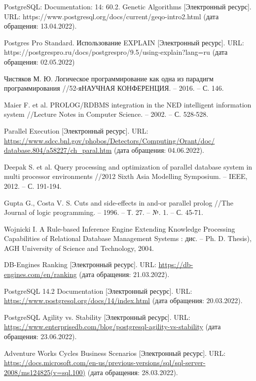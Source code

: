 \begin{thebibliography}{3}
	PostgreSQL: Documentation: 14: 60.2. Genetic Algorithms [Электронный ресурс]. URL: https://www.postgresql.org/docs/current/geqo-intro2.html (дата обращения: 13.04.2022).
	
	Postgres Pro Standard. Использование EXPLAIN [Электронный ресурс]. URL:
	https://postgrespro.ru/docs/postgrespro/9.5/using-explain?lang=ru (дата обращения: 02.05.2022)
	
	Чистяков М. Ю. Логическое программирование как одна из парадигм программирования //52-яНАУЧНАЯ КОНФЕРЕНЦИЯ. – 2016. – С. 146.
	
	Maier F. et al. PROLOG/RDBMS integration in the NED intelligent information system //Lecture Notes in Computer Science. – 2002. – С. 528-528.
	
	Parallel Execution [Электронный ресурс]. URL:  \url{https://www.sdcc.bnl.gov/phobos/Detectors/Computing/Orant/doc/ 
	database.804/a58227/ch\_paral.htm} (дата обращения: 04.06.2022).
	
	Deepak S. et al. Query processing and optimization of parallel database system in multi processor environments //2012 Sixth Asia Modelling Symposium. – IEEE, 2012. – С. 191-194.
	
	Gupta G., Costa V. S. Cuts and side-effects in and-or parallel prolog //The Journal of logic programming. – 1996. – Т. 27. – №. 1. – С. 45-71.
	
	Wojnicki I. A Rule-based Inference Engine Extending Knowledge Processing Capabilities of Relational Database Management Systems : дис. – Ph. D. Thesis), AGH University of Science and Technology, 2004.
	
	DB-Engines Ranking [Электронный ресурс]. URL: \url{https://db-engines.com/en/ranking}
	(дата обращения: 21.03.2022).
	
	PostgreSQL 14.2 Documentation [Электронный ресурс]. URL: \url{https://www.postgresql.org/docs/14/index.html} (дата обращения: 20.03.2022).
	
	PostgreSQL Agility vs. Stability [Электронный ресурс]. URL: \url{https://www.enterprisedb.com/blog/postgresql-agility-vs-stability} (дата обращения: 23.06.2022).
	
	Adventure Works Cycles Business Scenarios [Электронный ресурс]. URL: \url{https://docs.microsoft.com/en-us/previous-versions/sql/sql-server-2008/ms124825(v=sql.100)} (дата обращения: 28.03.2022).
	

\end{thebibliography}
